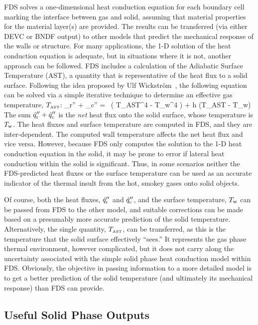 \documentclass[11pt]{book}
\begin{document}
FDS solves a one-dimensional heat conduction equation for each
boundary cell marking the interface between gas and solid, assuming
that material properties for the material layer(s) are provided. The
results can be transferred (via either {\ct DEVC} or {\ct BNDF}
output) to other models that predict the mechanical response of the
walls or structure. For many applications, the 1-D solution of the
heat conduction equation is adequate, but in situations where it is
not, another approach can be followed. FDS includes a calculation of
the Adiabatic Surface Temperature (AST), a quantity that is
representative of the heat flux to a solid surface. Following the idea
proposed by Ulf Wickstr\"{o}m~\cite{Wickstrom:Interflam2007}, the
following equation can be solved via a simple iterative technique to
determine an effective gas temperature, $T_{\hbox{\tiny AST}}$:
\be {}_{\rm r}'' + _{\rm c}'' = \epsilon \sigma \, \left(
T_{\hbox{\tiny AST}}^4 - T_{\rm w}^4 \right) + h (T_{\hbox{\tiny AST}} - T_{\rm w})  \ee
The sum $\dot{q}_{\rm r}'' + \dot{q}_{\rm c}''$ is the {\em net} heat flux onto
the solid surface, whose temperature is $T_{\rm w}$. The heat fluxes and
surface temperature are computed in FDS, and they are
inter-dependent. The computed wall temperature affects the net heat
flux and vice versa. However, because FDS only computes the solution
to the 1-D heat conduction equation in the solid, it may be prone to
error if lateral heat conduction within the solid is
significant. Thus, in some scenarios neither the FDS-predicted heat
fluxes or the surface temperature can be used as an accurate indicator
of the thermal insult from the hot, smokey gases onto solid objects.

Of course, both the heat fluxes, $\dot{q}_{\rm r}''$ and $\dot{q}_{\rm c}''$, and
the surface temperature, $T_{\rm w}$ can be passed from FDS to the other
model, and suitable corrections can be made based on a presumably more
accurate prediction of the solid temperature.  Alternatively, the
single quantity, $T_{\hbox{\tiny AST}}$, can be transferred, as this
is the temperature that the solid surface effectively ``sees.'' It
represents the gas phase thermal environment, however complicated, but
it does not carry along the uncertainty associated with the simple
solid phase heat conduction model within FDS. Obviously, the objective
in passing information to a more detailed model is to get a better
prediction of the solid temperature (and ultimately its mechanical
response) than FDS can provide.


\subsection{Useful Solid Phase Outputs}
\label{info:material_components}
\end{document}
